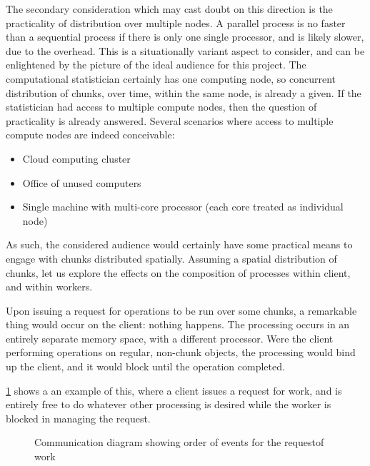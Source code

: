The secondary consideration which may cast doubt on this direction is
the practicality of distribution over multiple nodes. A parallel process
is no faster than a sequential process if there is only one single
processor, and is likely slower, due to the overhead. This is a
situationally variant aspect to consider, and can be enlightened by the
picture of the ideal audience for this project. The computational
statistician certainly has one computing node, so concurrent
distribution of chunks, over time, within the same node, is already a
given. If the statistician had access to multiple compute nodes, then
the question of practicality is already answered. Several scenarios
where access to multiple compute nodes are indeed conceivable:

\begin{itemize}
  \item
        Cloud computing cluster
  \item
        Office of unused computers
  \item
        Single machine with multi-core processor (each core treated as
        individual node)
\end{itemize}

As such, the considered audience would certainly have some practical
means to engage with chunks distributed spatially. Assuming a spatial
distribution of chunks, let us explore the effects on the composition of
processes within client, and within workers.

Upon issuing a request for operations to be run over some chunks, a
remarkable thing would occur on the client: nothing happens. The
processing occurs in an entirely separate memory space, with a different
processor. Were the client performing operations on regular, non-chunk
objects, the processing would bind up the client, and it would block
until the operation completed.

\ref{fig:work-request} shows a an example of this, where a client issues
a request for work, and is entirely free to do whatever other processing
is desired while the worker is blocked in managing the request.

\begin{figure}
  \centering
  
  \caption{Communication diagram showing order of events for the requestof work}
  \label{fig:work-request}
\end{figure}

